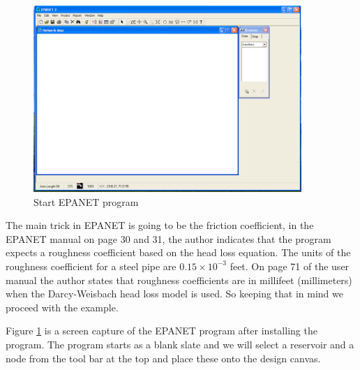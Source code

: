 \begin{figure}[htbp] %
   \centering
   \includegraphics[width=4in]{epanet-start.pdf} 
   \caption{Start EPANET program}
   \label{fig:epanet-start}
\end{figure}
The main trick in EPANET is going to be the friction coefficient, in the EPANET manual on page 30 and 31, the author indicates that the program expects a roughness coefficient based on the head loss equation.  The units of the roughness coefficient for a steel pipe are $0.15 \times 10^{-3}$ feet.   On page 71 of the user manual the author states that roughness coefficients are in millifeet (millimeters) when the Darcy-Weisbach head loss model is used.   So keeping that in mind we proceed with the example.

Figure \ref{fig:epanet-start} is a screen capture of the EPANET program after installing the program.   The program starts as a blank slate and we will select a reservoir and a node from the tool bar at the top and place these onto the design canvas.

